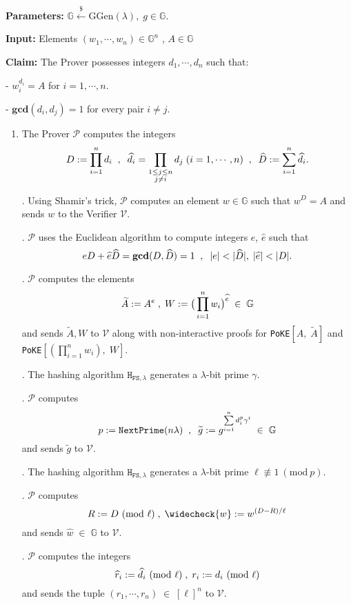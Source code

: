 \documentclass[11pt, lettersize, notitlepage, leqno, footskip=0.6cm]{article}
\newcommand{\pl}{\prod\limits}
\newcommand{\slim}{\sum\limits}
\newcommand{\ttt}{\texttt}
\newcommand{\bG}{\mathbb{G}}
\newcommand{\wti}{\widetilde}
\newcommand{\mc}{\mathcal}
\newcommand{\mb}{\mathbb}
\newcommand{\mbf}{\mathbf}
\newcommand{\mr}{\mathrm}
\newcommand{\lam}{\lambda}
\newcommand{\lamb}{\lambda}
\newcommand{\what}{\widehat}
\newcommand{\weck}{\widecheck}
\newcommand{\mP}{\mc{P}}
\newcommand{\V}{\mc{V}}
\newcommand{\vs}{\vspace{-0.15cm}}
\newcommand{\noin}{\noindent}
\newcommand{\Mod}[1]{\ (\mathrm{mod}\ #1)}
\newcommand{\GCD}{\mbf{gcd}}
\numberwithin{equation}{section}
\begin{document}
\noin \textbf{Parameters:} $\mb{G}\xleftarrow{\$} \mr{GGen}(\lamb), \; g\in \mb{G}$.

\noin \textbf{Input:} Elements $(w_1,\cdots, w_n)\in \mb{G}^n$ , $A\in\mb{G}$

\noin \textbf{Claim:} The Prover possesses integers $ d_1,\cdots, d_n$ such that:

\noin - $w_i^{d_i} = A$ for $i = 1,\cdots,n$.

\noin - $\GCD(d_i, d_j) = 1$ for every pair $i\neq j$.

\begin{enumerate}[wide, labelwidth=!, labelindent=0pt]\vspace{-0.2cm} \item The Prover $\mc{P}$ computes the integers \vs $$D := \prod\limits_{i=1}^n d_i\;\;,\;\;\what{d}_i = \pl_{\substack{1\leq j\leq n\\ j\neq i}} d_j\;(i=1,\cdots,n)\;\;,\;\; \what{D}:=\slim_{i=1}^n\what{d}_i. \vspace{-0.2cm} $$

\noin 2. Using Shamir's trick, $\mc{P}$ computes an element $w\in\mb{G}$ such that $w^D = A$ and sends $w$ to the Verifier $\mc{V}$.

\noin 3. $\mP$ uses the Euclidean algorithm to compute integers $e$, $\what{e}$ such that \vs $$eD+\what{e}\what{D} = \GCD(D,\what{D}) = 1\;\;,\;\;|e|< |\what{D}|,\;|\what{e}|< |{D}|.\vs $$

\noin 4. $\mP$ computes the elements \vspace{-0.3cm} $$\wti{A}:= A^{e}\;,\;W := \big(\pl_{i=1}^n w_i\big)^{\what{e}}\;\in\;\bG\vs $$ and sends $\wti{A},W$ to $\V$ along with non-interactive proofs for \verb|PoKE|$[A,\; \wti{A}]$ and \verb|PoKE|$[(\prod_{i=1}^n w_i),\; W]$.

\noin 5. The hashing algorithm $\ttt{H}_{\ttt{FS},\lam}$ generates a $\lam$-bit prime $\gamma$.

\noin 6. $\mc{P}$ computes \vs $$p:= \ttt{NextPrime}(n\lam)\;\;,\;\;\wti{g} := g^{\slim_{i=1}^n d_i^{p}\gamma^i}\;\in\;\bG\vs $$ and sends $\wti{g}$ to $\mc{V}$.

\noin 7. The hashing algorithm $\ttt{H}_{\ttt{FS},\lam}$ generates a $\lam$-bit prime $\ell\not\equiv 1\Mod{p}$.

\noin 8. $\mc{P}$ computes \vs $$R:= D\Mod{\ell}\;,\; \weck{w}:= w^{(D-R)/\ell}\vs $$ and sends $\what{w}\;\in\;\bG$ to $\mc{V}$.

\noin 9. $\mc{P}$ computes the integers \vs $$\what{r}_i:= \what{d}_i\Mod{\ell}\;,\;{r}_i:= {d}_i\Mod{\ell}\vs $$ and sends the tuple $(r_1,\cdots,r_n)\;\in\;[\ell]^n$ to $\mc{V}$.


\end{enumerate}
\end{document}

